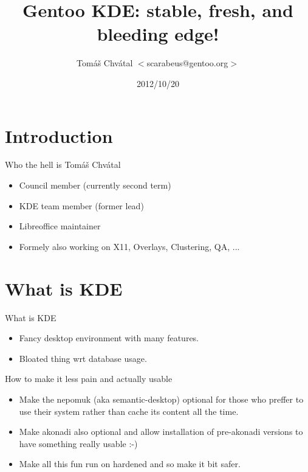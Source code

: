 \documentclass{beamer}
\title{Gentoo KDE: stable, fresh, and bleeding edge!}
\author[Tomáš Chvátal]{Tomáš Chvátal $<$scarabeus@gentoo.org$>$}
\date{2012/10/20}
\begin{document}
\frame{\titlepage}
\section{Introduction}

\begin{frame}{Who the hell is Tomáš Chvátal}
	\begin{itemize}
		\item Council member (currently second term)
		\item KDE team member (former lead)
		\item Libreoffice maintainer
		\item Formely also working on X11, Overlays, Clustering, QA, ...
	\end{itemize}
\end{frame}

\section{What is KDE}

\begin{frame}{What is KDE}
	\begin{itemize}
		\item Fancy desktop environment with many features.
		\item Bloated thing wrt database usage.
	\end{itemize}
\end{frame}

\begin{frame}{How to make it less pain and actually usable}
	\begin{itemize}
		\item Make the nepomuk (aka semantic-desktop) optional for those who preffer to use their system rather than cache its content all the time.
		\item Make akonadi also optional and allow installation of pre-akonadi versions to have something really usable :-)
		\item Make all this fun run on hardened and so make it bit safer.
	\end{itemize}
\end{frame}
\end{document}
